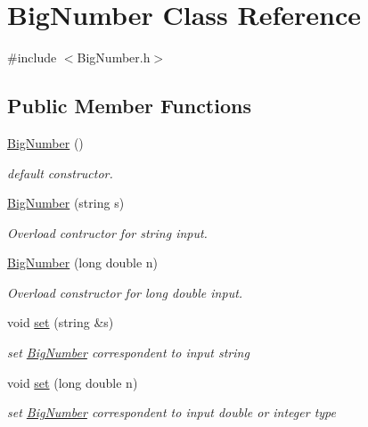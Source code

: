 \hypertarget{class_big_number}{}\section{Big\+Number Class Reference}
\label{class_big_number}


{\ttfamily \#include $<$Big\+Number.\+h$>$}

\subsection*{Public Member Functions}
\begin{DoxyCompactItemize}
\item 
\mbox{\hyperlink{class_big_number_a0d12fbec476322042ba36e61e1b0db82}{Big\+Number}} ()
\begin{DoxyCompactList}\small\item\em default constructor. \end{DoxyCompactList}\item 
\mbox{\hyperlink{class_big_number_ac6701b663665e17ab6d71df11bc1cc8f}{Big\+Number}} (string s)
\begin{DoxyCompactList}\small\item\em Overload contructor for string input. \end{DoxyCompactList}\item 
\mbox{\hyperlink{class_big_number_affd2252ae710d81872e07af53e1c8e7c}{Big\+Number}} (long double n)
\begin{DoxyCompactList}\small\item\em Overload constructor for long double input. \end{DoxyCompactList}\item 
void \mbox{\hyperlink{class_big_number_af246626b1cf1be05a58e228b599fc6ee}{set}} (string \&s)
\begin{DoxyCompactList}\small\item\em set \mbox{\hyperlink{class_big_number}{Big\+Number}} correspondent to input string \end{DoxyCompactList}\item 
void \mbox{\hyperlink{class_big_number_aa9cb87a230df925f241756d1e98f1057}{set}} (long double n)
\begin{DoxyCompactList}\small\item\em set \mbox{\hyperlink{class_big_number}{Big\+Number}} correspondent to input double or integer type \end{DoxyCompactList}\item 

\end{DoxyCompactItemize}
